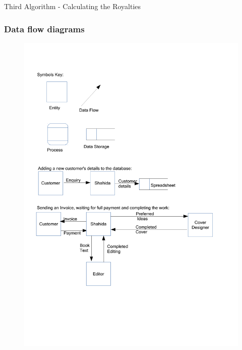 \begin{algorithm}[H]
    \caption{Third Algorithm - Calculating the Royalties}
\begin{algorithmic}[1]


\end{algorithmic}
\end{algorithm}

\subsubsection{Data flow diagrams}

\begin{figure}[H]
    \includegraphics[width=\textwidth]{./Analysis/Data Flow Diagrams 1.pdf}
\end{figure}

